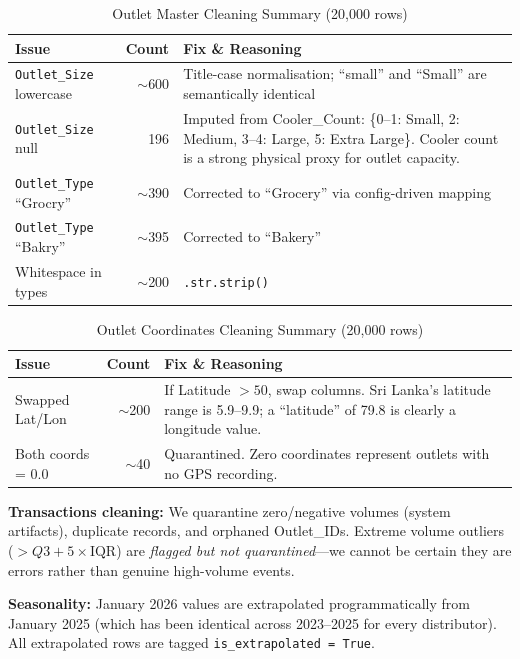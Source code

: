 \documentclass[10.75pt, a4paper]{article}
\begin{document}
\begin{table}[H]
\centering
\caption{Outlet Master Cleaning Summary (20,000 rows)}
\begin{tabularx}{\textwidth}{lrX}
\toprule
\textbf{Issue} & \textbf{Count} & \textbf{Fix \& Reasoning} \\
\midrule
\texttt{Outlet\_Size} lowercase & $\sim$600 & Title-case normalisation; ``small'' and ``Small'' are semantically identical \\
\texttt{Outlet\_Size} null & 196 & Imputed from Cooler\_Count: \{0--1: Small, 2: Medium, 3--4: Large, 5: Extra Large\}. Cooler count is a strong physical proxy for outlet capacity. \\
\texttt{Outlet\_Type} ``Grocry'' & $\sim$390 & Corrected to ``Grocery'' via config-driven mapping \\
\texttt{Outlet\_Type} ``Bakry'' & $\sim$395 & Corrected to ``Bakery'' \\
Whitespace in types & $\sim$200 & \texttt{.str.strip()} \\
\bottomrule
\end{tabularx}
\end{table}

\begin{table}[H]
\centering
\caption{Outlet Coordinates Cleaning Summary (20,000 rows)}
\begin{tabularx}{\textwidth}{lrX}
\toprule
\textbf{Issue} & \textbf{Count} & \textbf{Fix \& Reasoning} \\
\midrule
Swapped Lat/Lon & $\sim$200 & If Latitude $> 50$, swap columns. Sri Lanka's latitude range is 5.9--9.9; a ``latitude'' of 79.8 is clearly a longitude value. \\
Both coords = 0.0 & $\sim$40 & Quarantined. Zero coordinates represent outlets with no GPS recording. \\
\bottomrule
\end{tabularx}
\end{table}

\textbf{Transactions cleaning:} We quarantine zero/negative volumes (system artifacts), duplicate records, and orphaned Outlet\_IDs. Extreme volume outliers ($> Q3 + 5 \times \text{IQR}$) are \textit{flagged but not quarantined}---we cannot be certain they are errors rather than genuine high-volume events.

\textbf{Seasonality:} January 2026 values are extrapolated programmatically from January 2025 (which has been identical across 2023--2025 for every distributor). All extrapolated rows are tagged \texttt{is\_extrapolated = True}.
\end{document}
